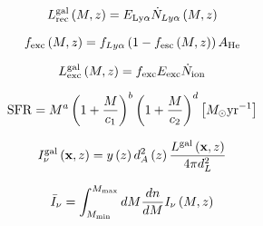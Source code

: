 \begin{equation}
  L_{\rm rec}^{\rm gal} \left( M, z\right) = E_{\rm Ly\alpha} \dot{N}_{Ly\alpha} \left( M, z\right)
\end{equation}

\begin{equation}
  f_{\rm exc} \left( M, z\right) = f_{Ly\alpha} \left( 1 - f_{\rm esc} \left( M, z\right) \right) A_{\rm He}
\end{equation}

\begin{equation}
  L_{\rm exc}^{\rm gal} \left( M, z\right) = f_{\rm exc} E_{\rm exc} \dot{N}_{\rm ion}
\end{equation}

\begin{equation}
  {\rm SFR} = M^{a} \left( 1 + \frac{M}{c_1}\right)^b \left(1 + \frac{M}{c_2} \right)^d \left[ M_{\odot} {\rm yr}^{-1} \right]
\end{equation}

\begin{equation}
  I_{\nu}^{\rm gal}\left(\textbf{x}, z \right) = y \left(z \right)d_A^2 \left(z \right) \frac{L^{\rm gal} \left(\textbf{x}, z \right)}{4 \pi d_L^2}
\end{equation}

\begin{equation}
\bar{I}_{\nu} = \int_{M_{\rm min}}^{M_{\rm max}} dM \frac{dn}{dM} I_{\nu} \left(M, z \right)
\end{equation}

